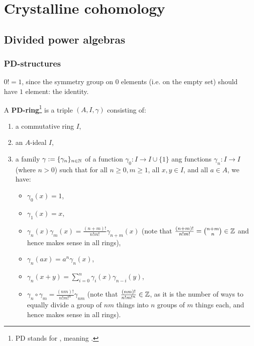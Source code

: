 \section{Crystalline cohomology}
    \subsection{Divided power algebras}
        \subsubsection{PD-structures}
            \begin{convention}
                $0! = 1$, since the symmetry group on $0$ elements (i.e. on the empty set) should have $1$ element: the identity.
            \end{convention}
            \begin{definition}[PD-structures] \label{def: PD_structures}
                A \textbf{PD-ring}\footnote{PD stands for , meaning .} is a triple $(A, I, \gamma)$ consisting of:
                    \begin{enumerate}
                        \item a commutative ring $I$,
                        \item an $A$-ideal $I$,
                        \item a family $\gamma := \{\gamma_n\}_{n \in \mathbb{N}}$ of a function $\gamma_0: I \to I \cup \{1\}$ ang functions $\gamma_n: I \to I$ (where $n > 0$) such that for all $n \geq 0, m \geq 1$, all $x, y \in I$, and all $a \in A$, we have:
                            \begin{itemize}
                                \item $\gamma_0(x) = 1$,
                                \item $\gamma_1(x) = x$,
                                \item $\gamma_n(x) \gamma_m(x) = \frac{(n + m)!}{n! m!} \gamma_{n + m}(x)$ (note that $\frac{(n + m)!}{n! m!} = \binom{n + m}{n} \in \mathbb{Z}$ and hence makes sense in all rings),
                                \item $\gamma_n(ax) = a^n \gamma_n(x)$,
                                \item $\gamma_n(x + y) = \sum_{i = 0}^n \gamma_i(x) \gamma_{n - i}(y)$, 
                                \item $\gamma_n \circ \gamma_m = \frac{(nm)!}{n! m!^n} \gamma_{nm}$ (note that $\frac{(nm)!}{n! m!^n} \in \mathbb{Z}$, as it is the number of ways to equally divide a group of $nm$ things into $n$ groups of $m$ things each, and hence makes sense in all rings).
                            \end{itemize}
                    \end{enumerate}
            \end{definition}
